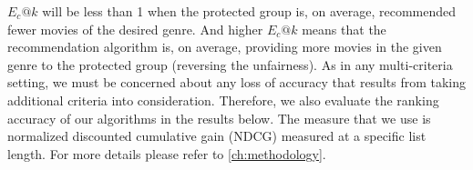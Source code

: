 
$E_c@k$ will be less than 1 when the protected group is, on average, recommended fewer movies of the desired genre. And higher $E_c@k$ means that the recommendation algorithm is, on average, providing more movies in the given genre to the protected group (reversing the unfairness). As in any multi-criteria setting, we must be concerned about any loss of accuracy that results from taking additional criteria into consideration. Therefore, we also evaluate the ranking accuracy of our algorithms in the results below. The measure that we use is normalized discounted cumulative gain (NDCG) measured at a specific list length. For more details please refer to \ref{ch:methodology}.









